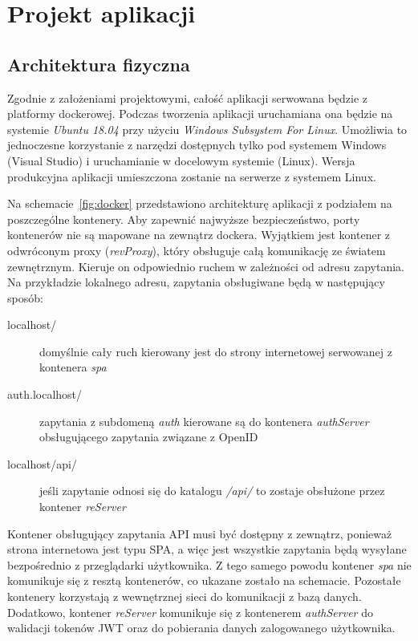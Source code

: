 \chapter{Projekt aplikacji}
\label{sec:projekt}

\section{Architektura fizyczna}
	Zgodnie z założeniami projektowymi, całość aplikacji serwowana będzie z platformy dockerowej.
	Podczas tworzenia aplikacji uruchamiana ona będzie na systemie \emph{Ubuntu 18.04} przy użyciu \emph{Windows Subsystem For Linux}.
	Umożliwia to jednoczesne korzystanie z narzędzi dostępnych tylko pod systemem Windows (Visual Studio) i uruchamianie w docelowym systemie (Linux).
	Wersja produkcyjna aplikacji umieszczona zostanie na serwerze z systemem Linux.

	Na schemacie~\ref{fig:docker} przedstawiono architekturę aplikacji z podziałem na poszczególne kontenery.
	Aby zapewnić najwyższe bezpieczeństwo, porty kontenerów nie są mapowane na zewnątrz dockera.
	Wyjątkiem jest kontener z odwróconym proxy (\emph{revProxy}), który obsługuje całą komunikację ze światem zewnętrznym.
	Kieruje on odpowiednio ruchem w zależności od adresu zapytania.
	Na przykładzie lokalnego adresu, zapytania obsługiwane będą w następujący sposób:
	\begin{description}
		\item[localhost/] domyślnie cały ruch kierowany jest do strony internetowej serwowanej z kontenera \emph{spa}
		\item[auth.localhost/] zapytania z subdomeną \emph{auth} kierowane są do kontenera \emph{authServer} obsługującego zapytania związane z OpenID
		\item[localhost/api/] jeśli zapytanie odnosi się do katalogu \emph{/api/} to zostaje obsłużone przez kontener \emph{reServer}
	\end{description}

	Kontener obsługujący zapytania API musi być dostępny z zewnątrz, ponieważ strona internetowa jest typu SPA,
	a więc jest wszystkie zapytania będą wysyłane bezpośrednio z przeglądarki użytkownika.
	Z tego samego powodu kontener \emph{spa} nie komunikuje się z resztą kontenerów, co ukazane zostało na schemacie.
	Pozostałe kontenery korzystają z wewnętrznej sieci do komunikacji z bazą danych.
	Dodatkowo, kontener \emph{reServer} komunikuje się z kontenerem \emph{authServer} do walidacji tokenów JWT oraz do pobierania danych zalogowanego użytkownika.

